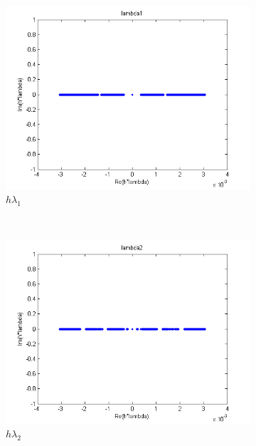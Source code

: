 \begin{figure}
  \centering
  \begin{subfigure}[b]{0.5\textwidth}
    \includegraphics[width=\textwidth]{images/Q1_hlambda1.png}
    \caption{$h \lambda_1$}
  \end{subfigure}%
  ~ %
  \begin{subfigure}[b]{0.5\textwidth}
    \includegraphics[width=\textwidth]{images/Q1_hlambda2.png}
    \caption{$h \lambda_2$}
  \end{subfigure}
  \begin{subfigure}[b]{0.5\textwidth}

\end{subfigure}
\end{figure}
